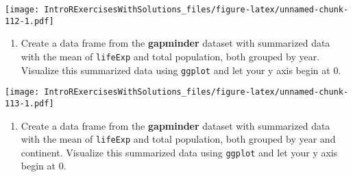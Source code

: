 \documentclass[]{article}
\newenvironment{Shaded}{\begin{snugshade}}{\end{snugshade}}
\newcommand{\KeywordTok}[1]{\textcolor[rgb]{0.13,0.29,0.53}{\textbf{#1}}}
\newcommand{\DataTypeTok}[1]{\textcolor[rgb]{0.13,0.29,0.53}{#1}}
\newcommand{\DecValTok}[1]{\textcolor[rgb]{0.00,0.00,0.81}{#1}}
\newcommand{\StringTok}[1]{\textcolor[rgb]{0.31,0.60,0.02}{#1}}
\newcommand{\CommentTok}[1]{\textcolor[rgb]{0.56,0.35,0.01}{\textit{#1}}}
\newcommand{\OperatorTok}[1]{\textcolor[rgb]{0.81,0.36,0.00}{\textbf{#1}}}
\newcommand{\NormalTok}[1]{#1}
\providecommand{\tightlist}{%
  \setlength{\itemsep}{0pt}\setlength{\parskip}{0pt}}
\begin{document}
\texttt{[image: IntroRExercisesWithSolutions\_files/figure-latex/unnamed-chunk-112-1.pdf]}

\begin{enumerate}
\def\labelenumi{\arabic{enumi}.}
\setcounter{enumi}{7}
\tightlist
\item
  Create a data frame from the \textbf{gapminder} dataset with
  summarized data with the mean of \texttt{lifeExp} and total
  population, both grouped by year. Visualize this summarized data using
  \texttt{ggplot} and let your y axis begin at 0.
\end{enumerate}

\begin{Shaded}
\end{Shaded}

\texttt{[image: IntroRExercisesWithSolutions\_files/figure-latex/unnamed-chunk-113-1.pdf]}

\begin{enumerate}
\def\labelenumi{\arabic{enumi}.}
\setcounter{enumi}{8}
\tightlist
\item
  Create a data frame from the \textbf{gapminder} dataset with
  summarized data with the mean of \texttt{lifeExp} and total
  population, both grouped by year and continent. Visualize this
  summarized data using \texttt{ggplot} and let your y axis begin at 0.
\end{enumerate}

\begin{Shaded}
\end{Shaded}
\end{document}
